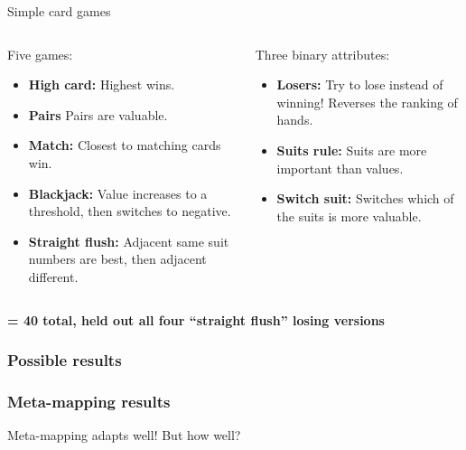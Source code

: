 \documentclass{beamer}
\begin{document}
\begin{frame}{Simple card games}

\begin{columns}
\begin{column}{0.5\textwidth}
Five games:
\begin{itemize}
\item \textbf{High card:} Highest wins.
\item \textbf{Pairs} Pairs are valuable. 
\item \textbf{Match:} Closest to matching cards win. 
\item \textbf{Blackjack:} Value increases to a threshold, then switches to negative. 
\item \textbf{Straight flush:} Adjacent same suit numbers are best, then adjacent different. 
\end{itemize}
\end{column}

\begin{column}{0.5\textwidth}
Three binary attributes:
\begin{itemize}
\item \textbf{Losers:} Try to lose instead of winning! Reverses the ranking of hands.
\item \textbf{Suits rule:} Suits are more important than values. 
\item \textbf{Switch suit:} Switches which of the suits is more valuable.
\end{itemize}
\vspace{3.2em}
\end{column}
\end{columns}
\vspace{1em}
\textbf{= 40 total, held out all four ``straight flush'' losing versions}
\end{frame}


\begin{frame}
\frametitle<1>{Possible results}
\frametitle<2->{Meta-mapping results}
\end{frame}

\begin{frame}[standout]
Meta-mapping adapts well! But how well?
\end{frame}
\end{document}
